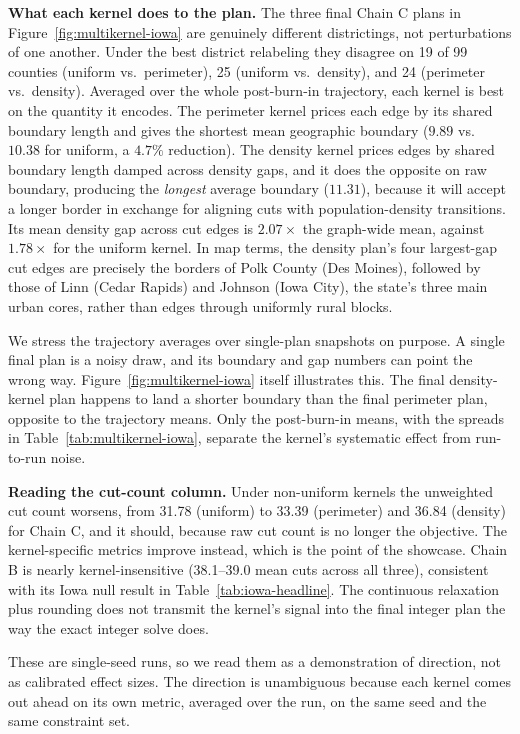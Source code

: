 \documentclass[11pt]{article}
\begin{document}
\textbf{What each kernel does to the plan.} The three final Chain C
plans in Figure~\ref{fig:multikernel-iowa} are genuinely different
districtings, not perturbations of one another. Under the best
district relabeling they disagree on 19 of 99 counties (uniform vs.\
perimeter), 25 (uniform vs.\ density), and 24 (perimeter vs.\
density). Averaged over the whole post-burn-in trajectory, each
kernel is best on the quantity it encodes. The perimeter kernel
prices each edge by its shared boundary length and gives the shortest
mean geographic boundary ($9.89$ vs.\ $10.38$ for uniform, a $4.7\%$
reduction). The density kernel prices edges by shared boundary length
damped across density gaps, and it does the opposite on raw boundary,
producing the \emph{longest} average boundary ($11.31$), because it
will accept a longer border in exchange for aligning cuts with
population-density transitions. Its mean density gap across cut edges
is $2.07\times$ the graph-wide mean, against $1.78\times$ for the
uniform kernel. In map terms, the density plan's four largest-gap cut
edges are precisely the borders of Polk County (Des Moines), followed
by those of Linn (Cedar Rapids) and Johnson (Iowa City), the state's
three main urban cores, rather than edges through uniformly rural
blocks.

We stress the trajectory averages over single-plan snapshots on
purpose. A single final plan is a noisy draw, and its boundary and
gap numbers can point the wrong way. Figure~\ref{fig:multikernel-iowa}
itself illustrates this. The final density-kernel plan happens to land
a shorter boundary than the final perimeter plan, opposite to the
trajectory means. Only the post-burn-in means, with the
spreads in Table~\ref{tab:multikernel-iowa}, separate the kernel's
systematic effect from run-to-run noise.

\textbf{Reading the cut-count column.} Under non-uniform
kernels the unweighted cut count worsens, from 31.78 (uniform) to
33.39 (perimeter) and 36.84 (density) for Chain C, and it should, because
raw cut count is no longer the objective. The kernel-specific metrics
improve instead, which is the point of the showcase. Chain B is
nearly kernel-insensitive (38.1--39.0 mean cuts across all three),
consistent with its Iowa null result in
Table~\ref{tab:iowa-headline}. The continuous relaxation plus
rounding does not transmit the kernel's signal into the final integer
plan the way the exact integer solve does.

These are single-seed runs, so we read them as a demonstration of
direction, not as calibrated effect sizes. The direction is
unambiguous because each kernel comes out ahead on its own metric,
averaged over the run, on the same seed and the same constraint set.
\end{document}
